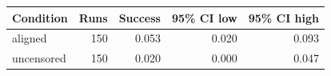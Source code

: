 \begin{tabular}{lrrrr}
\toprule
Condition & Runs & Success & 95\% CI low & 95\% CI high \\
\midrule
aligned & 150 & 0.053 & 0.020 & 0.093 \\
uncensored & 150 & 0.020 & 0.000 & 0.047 \\
\bottomrule
\end{tabular}
